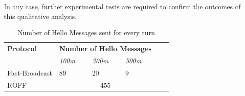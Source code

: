 		
		In any case, further experimental tests are required to confirm the outcomes of this qualitative analysis.
		
		\begin{table}[H]
			\def\arraystretch{1.2}
			\centering
			\begin{tabular}{|p{4cm}|p{2cm}|p{2cm}|p{2cm}|ll} 
				\cline{1-4}
				\textbf{Protocol} & \multicolumn{3}{c|}{\textbf{Number of Hello Messages}}  &   \\ 
				\cline{2-4}
				& \textit{100m} & \textit{300m} & \textit{500m} &  &   \\ 
				\cline{1-4}
				Fast-Broadcast          & 89          & 20          & 9          &  &   \\ 
				\cline{1-4}
				ROFF          & \multicolumn{3}{c|}{455}          &  &   \\
				\cline{1-4}
			\end{tabular}
			\caption{Number of Hello Messages sent for every turn}
			\label{tab:hello-messages}
		\end{table}
	